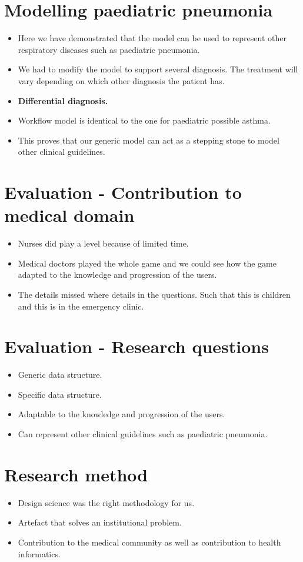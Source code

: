\documentclass[20pt]{extarticle}
\begin{document}
\section{Modelling paediatric pneumonia}
\begin{itemize}
	\item Here we have demonstrated that the model can be used to represent other respiratory diseases such as paediatric pneumonia.
	\item We had to modify the model to support several diagnosis. The treatment will vary depending on which other diagnosis the patient has.
	\item \textbf{Differential diagnosis.}
	\item Workflow model is identical to the one for paediatric possible asthma.
	\item This proves that our generic model can act as a stepping stone to model other clinical guidelines.
\end{itemize}

	\section{Evaluation - Contribution to medical domain}
	\begin{itemize}
		\item Nurses did play a level because of limited time.
		\item Medical doctors played the whole game and we could see how the game adapted to the knowledge and progression of the users.
		\item The details missed where details in the questions. Such that this is children and this is in the emergency clinic.
	\end{itemize}
	
	\section{Evaluation - Research questions}
	\begin{itemize}
		\item Generic data structure.
		\item Specific data structure.
		\item Adaptable to the knowledge and progression of the users.
		\item Can represent other clinical guidelines such as paediatric pneumonia.
	\end{itemize}

\section{Research method}
\begin{itemize}
	\item Design science was the right methodology for us.
	\item Artefact that solves an institutional problem.
	\item Contribution to the medical community as well as contribution to health informatics. 
\end{itemize}
\end{document}
